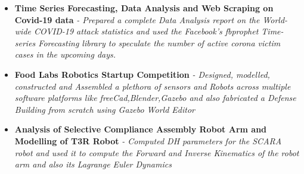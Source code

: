 \documentclass{article}
\begin{document}
\begin{itemize}
{          }
    \item{\textbf{\large{Time Series Forecasting, Data Analysis and Web Scraping on Covid-19 data}}}
          \newline
          \textit{- Prepared a complete Data Analysis report on the World-wide COVID-19 attack statistics and used the Facebook's fbprophet Time-series Forecasting library to speculate the number of active corona victim cases in the upcoming days.}
    \item{\textbf{\large{Food Labs Robotics Startup Competition}}}
          \newline
          \textit{- Designed, modelled, constructed and
              Assembled a plethora of sensors and Robots across multiple software platforms like
              freeCad,Blender,Gazebo and also fabricated a Defense Building from scratch using Gazebo World Editor}
    \item{\textbf{\large{Analysis of Selective Compliance Assembly Robot Arm and Modelling of T3R Robot}}}
          \newline
          \textit{- Computed DH parameters for the SCARA robot and used it to compute the Forward and Inverse Kinematics of the robot arm and also its Lagrange Euler Dynamics}
\end{itemize}


\end{document}
